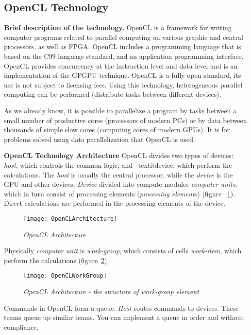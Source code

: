 { %
	\subsection{OpenCL Technology}
	\label{OpenCL:section}
	\par\textbf{Brief description of the technology.} OpenCL is a framework for writing computer programs related to parallel computing on various graphic and central processors, as well as FPGA. OpenCL includes a programming language that is based on the C99 language standard, and an application programming interface. OpenCL provides concurrency at the instruction level and data level and is an implementation of the GPGPU technique. OpenCL is a fully open standard, its use is not subject to licensing fees. Using this technology, heterogeneous parallel computing can be performed (distribute tasks between different devices).
	\par As we already know, it is possible to parallelize a program by tasks between a small number of productive cores (processors of modern PCs) or by data between thousands of simple slow cores (computing cores of modern GPUs). It is for problems solved using data parallelization that OpenCL is used.
	\par\textbf{OpenCL Technology Architecture} OpenCL divides two types of devices: \textit{host}, which controls the common logic, and \ textit{device}, which perform the calculations. The \textit{host} is usually the central processor, while the \textit{device} is the GPU and other devices. \textit{Device} divided into compute modules \textit{computer units}, which in turn consist of processing elements (\textit{processing elements}) (figure ~\ref{OpenCLArchitecture:image}). Direct calculations are performed in the processing elements of the device.
	\begin{figure}[H]
		\texttt{[image: OpenCLArchitecture]}
		\caption{\textit{OpenCL Architecture}}
		\label{OpenCLArchitecture:image}
	\end{figure}
	\par Physically \textit{computer unit} is \textit{work-group}, which consists of cells \textit{work-item}, which perform the calculations (figure~\ref{OpenCLWorkGroup:image}).
	\begin{figure}[H]
		\texttt{[image: OpenCLWorkGroup]}
		\caption{\textit{OpenCL  Architecture - the structure of work-group element}}
		\label{OpenCLWorkGroup:image}
	\end{figure}
	\par Commands in OpenCL form a queue. \textit {Host} routes commands to devices. These teams queue up similar teams. You can implement a queue in order and without compliance.
}
